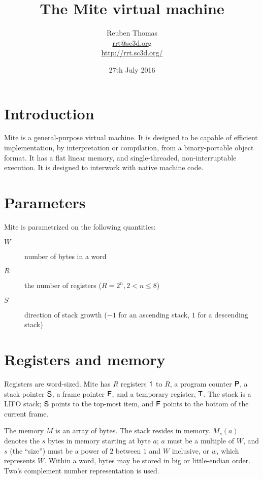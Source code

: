 \documentclass[english]{scrartcl}
\newcommand{\synfont}{\sffamily}
\newcommand{\syn}[1]{\ensuremath{\text{\synfont #1}}}
\begin{document}
\title{The Mite virtual machine}
\author{Reuben Thomas\\\url{rrt@sc3d.org}\\\url{http://rrt.sc3d.org/}}
\date{27th July 2016} \maketitle %



\section{Introduction}

Mite is a general-purpose virtual machine. It is designed to be
capable of efficient implementation, by interpretation or compilation,
from a binary-portable object format. It has a flat linear memory, and
single-threaded, non-interruptable execution. It is designed to
interwork with native machine code.



\section{Parameters}

Mite is parametrized on the following quantities:

\begin{description}
\item[$W$]number of bytes in a word

\item[$R$]the number of registers ($R=2^n, 2<n\leq 8$)

\item[$S$]direction of stack growth ($-1$ for an ascending stack, $1$
  for a descending stack)
\end{description}



\section{Registers and memory}

Registers are word-sized. Mite has $R$ registers \syn{1} to $R$, a
program counter \syn{P}, a stack pointer \syn{S}, a frame pointer
\syn{F}, and a temporary register, \syn{T}. The stack is a LIFO
stack; \syn{S} points to the top-most item, and \syn{F} points to the
bottom of the current frame.

The memory $M$ is an array of bytes. The stack resides in memory.
$M_s(a)$ denotes the $s$ bytes in memory starting at byte $a$; $a$
must be a multiple of $W$, and $s$ (the ``size'') must be a power of
$2$ between $1$ and $W$ inclusive, or $w$, which represents $W$.
Within a word, bytes may be stored in big or little-endian order.
Two's complement number representation is used.
\end{document}
